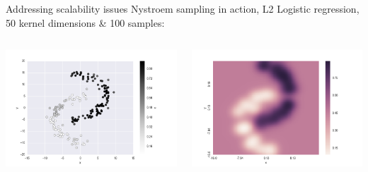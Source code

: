 \documentclass[11pt]{beamer}
\begin{document}
\begin{frame}{Addressing scalability issues}
Nystroem sampling in action, L2 Logistic regression, 50 kernel dimensions \& 100 samples:
\begin{columns}
\includegraphics[scale=0.3]{arcs_nystroem.png} 

\includegraphics[scale=0.3]{arcs_nystroem_hm.png} 
\end{columns}
\end{frame}
\end{document}
